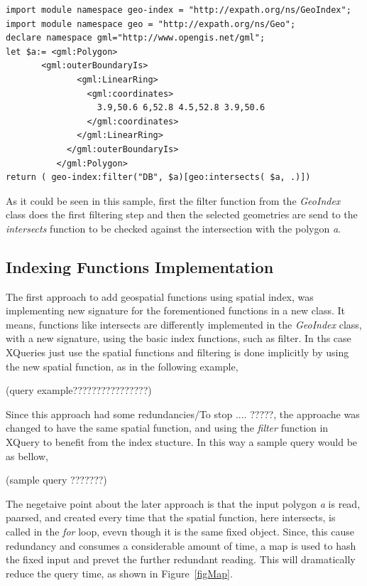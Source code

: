 \documentclass[a4paper,12pt]{article}
\begin{document}
\begin{verbatim}
import module namespace geo-index = "http://expath.org/ns/GeoIndex";
import module namespace geo = "http://expath.org/ns/Geo";
declare namespace gml="http://www.opengis.net/gml";
let $a:= <gml:Polygon>
	   <gml:outerBoundaryIs>
              <gml:LinearRing>
              	<gml:coordinates>
              	  3.9,50.6 6,52.8 4.5,52.8 3.9,50.6
              	</gml:coordinates>
              </gml:LinearRing>
            </gml:outerBoundaryIs>
          </gml:Polygon>
return ( geo-index:filter("DB", $a)[geo:intersects( $a, .)])
\end{verbatim}

As it could be seen in this sample, first the filter function from the \textit{GeoIndex} class does the first filtering step and then the selected geometries are send to the \textit{intersects} function to be checked against the intersection with the polygon \textit{a}.  

\subsection{Indexing Functions Implementation}
The first approach to add geospatial functions using spatial index, was implementing new signature for the forementioned functions in a new class. It means, functions like intersects are differently implemented in the \textit{GeoIndex} class, with a new signature, using the basic index functions, such as filter. In ths case XQueries just use the spatial functions and filtering is done implicitly by using the new spatial function, as in the following example,

(query example????????????????)

Since this approach had some redundancies/To stop ....  ?????, the approache was changed to have the same spatial function, and using the \textit{filter} function in XQuery to benefit from the index stucture. In this way a sample query would be as bellow,

 (sample query ???????)
 
The negetaive point about the later approach is that the input polygon \textit{a} is read, paarsed, and created every time that the spatial function, here intersects, is called in the \textit{for} loop, evevn though it is the same fixed object. Since, this cause redundancy and consumes a considerable amount of time, a map is used to hash the fixed input and prevet the further redundant reading. This will dramatically reduce the query time, as shown in Figure~\ref{figMap}.
\end{document}
